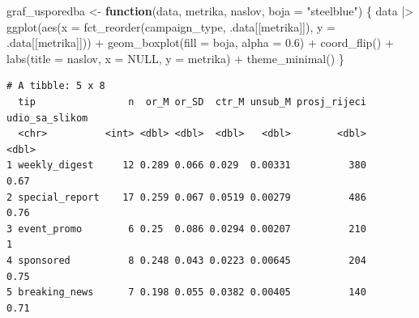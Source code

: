 \documentclass[
  croatian,
  letterpaper,
  DIV=11,
  numbers=noendperiod]{scrartcl}
\newenvironment{Shaded}{\begin{snugshade}}{\end{snugshade}}
\newcommand{\AttributeTok}[1]{\textcolor[rgb]{0.40,0.45,0.13}{#1}}
\newcommand{\CommentTok}[1]{\textcolor[rgb]{0.37,0.37,0.37}{#1}}
\newcommand{\ConstantTok}[1]{\textcolor[rgb]{0.56,0.35,0.01}{#1}}
\newcommand{\ControlFlowTok}[1]{\textcolor[rgb]{0.00,0.23,0.31}{\textbf{#1}}}
\newcommand{\FloatTok}[1]{\textcolor[rgb]{0.68,0.00,0.00}{#1}}
\newcommand{\FunctionTok}[1]{\textcolor[rgb]{0.28,0.35,0.67}{#1}}
\newcommand{\NormalTok}[1]{\textcolor[rgb]{0.00,0.23,0.31}{#1}}
\newcommand{\OtherTok}[1]{\textcolor[rgb]{0.00,0.23,0.31}{#1}}
\newcommand{\SpecialCharTok}[1]{\textcolor[rgb]{0.37,0.37,0.37}{#1}}
\newcommand{\StringTok}[1]{\textcolor[rgb]{0.13,0.47,0.30}{#1}}
\begin{document}
\begin{Shaded}
\begin{Highlighting}[]
\NormalTok{graf\_usporedba }\OtherTok{\textless{}{-}} \ControlFlowTok{function}\NormalTok{(data, metrika, naslov, }\AttributeTok{boja =} \StringTok{"steelblue"}\NormalTok{) \{}
\NormalTok{  data }\SpecialCharTok{|\textgreater{}}
    \FunctionTok{ggplot}\NormalTok{(}\FunctionTok{aes}\NormalTok{(}\AttributeTok{x =} \FunctionTok{fct\_reorder}\NormalTok{(campaign\_type, .data[[metrika]]),}
               \AttributeTok{y =}\NormalTok{ .data[[metrika]])) }\SpecialCharTok{+}
    \FunctionTok{geom\_boxplot}\NormalTok{(}\AttributeTok{fill =}\NormalTok{ boja, }\AttributeTok{alpha =} \FloatTok{0.6}\NormalTok{) }\SpecialCharTok{+}
    \FunctionTok{coord\_flip}\NormalTok{() }\SpecialCharTok{+}
    \FunctionTok{labs}\NormalTok{(}\AttributeTok{title =}\NormalTok{ naslov, }\AttributeTok{x =} \ConstantTok{NULL}\NormalTok{, }\AttributeTok{y =}\NormalTok{ metrika) }\SpecialCharTok{+}
    \FunctionTok{theme\_minimal}\NormalTok{()}
\NormalTok{\}}
\end{Highlighting}
\end{Shaded}

\begin{Shaded}
\end{Shaded}

\begin{verbatim}
# A tibble: 5 x 8
  tip                n  or_M or_SD  ctr_M unsub_M prosj_rijeci udio_sa_slikom
  <chr>          <int> <dbl> <dbl>  <dbl>   <dbl>        <dbl>          <dbl>
1 weekly_digest     12 0.289 0.066 0.029  0.00331          380           0.67
2 special_report    17 0.259 0.067 0.0519 0.00279          486           0.76
3 event_promo        6 0.25  0.086 0.0294 0.00207          210           1   
4 sponsored          8 0.248 0.043 0.0223 0.00645          204           0.75
5 breaking_news      7 0.198 0.055 0.0382 0.00405          140           0.71
\end{verbatim}
\end{document}
